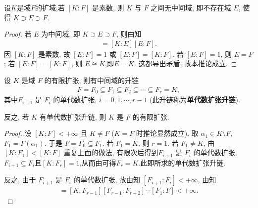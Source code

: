 \documentclass[../../main.tex]{subfiles}%
\begin{document}
\begin{corollary}
设$K$是域$F$的扩域,若 $[K:F]$ 是素数, 则 $K$ 与 $F$ 之间无中间域, 即不存在域 $E$, 使得 $K\supset E\supset F$.
\end{corollary}
\begin{proof}

若 $E$ 为中间域, 即 $K\supset E\supset F$, 则由知
\begin{align*}
[K:F]=[K:E][E:F].
\end{align*}
因 $[K:F]$ 是素数, 故 $[E:F]=1$ 或 $[E:F]=[K:F]$. 若 $[E:F]=1$, 则 $E=F$; 若 $[E:F]=[K:F]$, 则 $E\cong K$,即$E=K$. 这都导出矛盾, 故本推论成立.

\end{proof}

\begin{corollary}\label{corollary:抽象代数--推论3.2.111}
设 $K$ 是域 $F$ 的有限扩张, 则有中间域的升链
\begin{align*}
F=F_0\subseteq F_1\subseteq F_2\subseteq\cdots\subseteq F_r=K,
\end{align*}
其中$F_{i+1}$ 是 $F_i$ 的单代数扩张, $i=0,1,\cdots,r-1$ (此升链称为\textbf{单代数扩张升链}).

反之, 若 $K$ 有单代数扩张升链, 则 $K$ 是 $F$ 的有限扩张.
\end{corollary}

\begin{proof}

设 $[K:F]<+\infty$ 且 $K\neq F$ ($K=F$ 时推论显然成立). 取 $\alpha_1\in K\setminus F$, $F_1=F(\alpha_1)$. 于是 $F=F_0\subseteq F_1$. 若 $F_1=K$, 则 $r=1$. 若 $F_1\neq K$, 由 $[K:F_1]<[K:F]$ 重复上面的做法, 有限次后得到$F_{i+1}$ 是 $F_i$ 的单代数扩张,$F_{i+1}\subseteq F_i$且$[K:F_r]=1$,从而由可得$F_r=K$.此即所求的单代数扩张升链.

反之, 由于 $F_{i+1}$ 是 $F_i$ 的单代数扩张, 故由知 $[F_{i+1}:F_i]<+\infty$, 由知
\begin{align*}
[K:F]=[K:F_{r-1}][F_{r-1}:F_{r-2}]\cdots[F_1:F]<+\infty.
\end{align*}


\end{proof}
\end{document}
